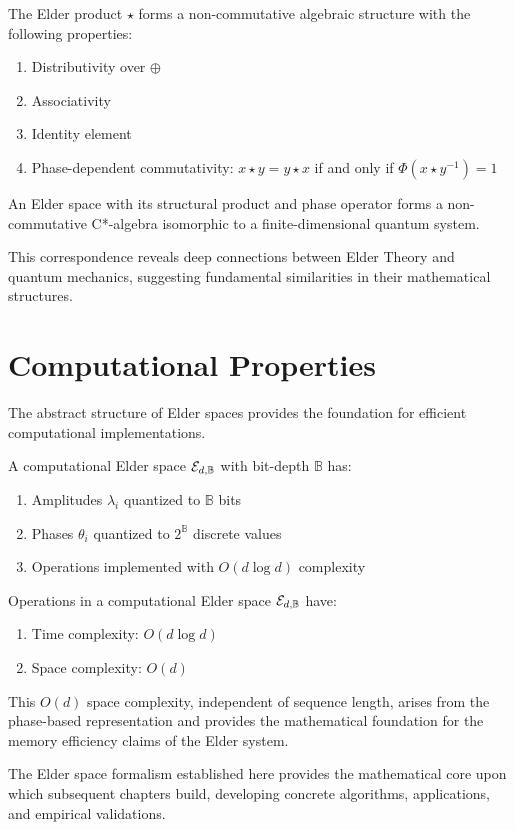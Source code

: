 The Elder product $\star$ forms a non-commutative algebraic structure with the following properties:
\begin{enumerate}
    \item Distributivity over $\oplus$
    \item Associativity
    \item Identity element
    \item Phase-dependent commutativity: $x \star y = y \star x$ if and only if $\Phi(x \star y^{-1}) = 1$
\end{enumerate}

\begin{theorem}
\label{thm:elder-quantum}
An Elder space with its structural product and phase operator forms a non-commutative C*-algebra isomorphic to a finite-dimensional quantum system.
\end{theorem}

This correspondence reveals deep connections between Elder Theory and quantum mechanics, suggesting fundamental similarities in their mathematical structures.

\section{Computational Properties}

The abstract structure of Elder spaces provides the foundation for efficient computational implementations.

\begin{definition}
A computational Elder space $\mathcal{E}_{d, \mathbb{B}}$ with bit-depth $\mathbb{B}$ has:
\begin{enumerate}
    \item Amplitudes $\lambda_i$ quantized to $\mathbb{B}$ bits
    \item Phases $\theta_i$ quantized to $2^{\mathbb{B}}$ discrete values
    \item Operations implemented with $O(d \log d)$ complexity
\end{enumerate}
\end{definition}

\begin{theorem}
Operations in a computational Elder space $\mathcal{E}_{d, \mathbb{B}}$ have:
\begin{enumerate}
    \item Time complexity: $O(d \log d)$
    \item Space complexity: $O(d)$
\end{enumerate}
\end{theorem}

This $O(d)$ space complexity, independent of sequence length, arises from the phase-based representation and provides the mathematical foundation for the memory efficiency claims of the Elder system.

The Elder space formalism established here provides the mathematical core upon which subsequent chapters build, developing concrete algorithms, applications, and empirical validations.